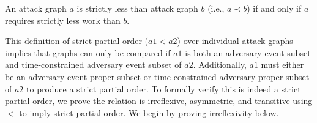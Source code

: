 \documentclass[runningheads]{llncs}
\theoremstyle{definition}
\begin{document}
\begin{definition}
    An attack graph $a$ is strictly less than attack graph $b$ (i.e., $a \prec b$) if and only if $a$ requires strictly less work than $b$.
\end{definition}

This definition of strict partial order ($a1 < a2$) over individual attack graphs implies that graphs can only be compared if $a1$ is both an adversary event subset and time-constrained adversary event subset of $a2$. Additionally, $a1$ must either be an adversary event proper subset or time-constrained adversary proper subset of $a2$ to produce a strict partial order. To formally verify this is indeed a strict partial order, we prove the relation is irreflexive, asymmetric, and transitive using $<$ to imply strict partial order. We begin by proving irreflexivity below.



\end{document}
